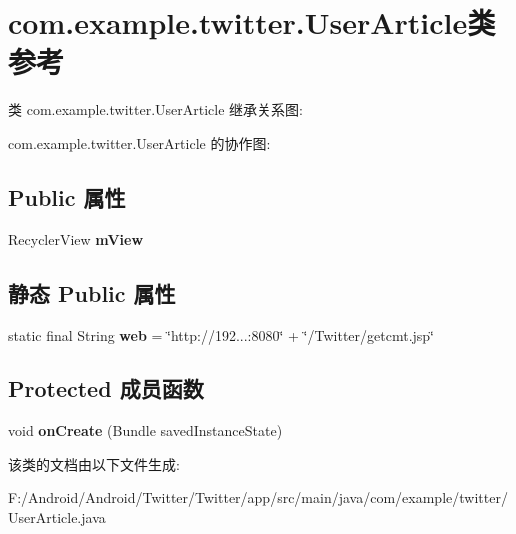\hypertarget{classcom_1_1example_1_1twitter_1_1_user_article}{}\section{com.\+example.\+twitter.\+User\+Article类 参考}
\label{classcom_1_1example_1_1twitter_1_1_user_article}


类 com.\+example.\+twitter.\+User\+Article 继承关系图\+:


com.\+example.\+twitter.\+User\+Article 的协作图\+:
\subsection*{Public 属性}
\begin{DoxyCompactItemize}
\item 
\mbox{\label{classcom_1_1example_1_1twitter_1_1_user_article_a8448f89d9d65561442160da7604212fc}} 
Recycler\+View {\bfseries m\+View}
\end{DoxyCompactItemize}
\subsection*{静态 Public 属性}
\begin{DoxyCompactItemize}
\item 
\mbox{\label{classcom_1_1example_1_1twitter_1_1_user_article_ade97a65866c24d3cffdfb94f341327d1}} 
static final String {\bfseries web} = \char`\"{}http\+://192...\+:8080\char`\"{} + \char`\"{}/Twitter/getcmt.\+jsp\char`\"{}
\end{DoxyCompactItemize}
\subsection*{Protected 成员函数}
\begin{DoxyCompactItemize}
\item 
\mbox{\label{classcom_1_1example_1_1twitter_1_1_user_article_a855d1cbf41f1594d53f3c90720045c23}} 
void {\bfseries on\+Create} (Bundle saved\+Instance\+State)
\end{DoxyCompactItemize}


该类的文档由以下文件生成\+:\begin{DoxyCompactItemize}
\item 
F\+:/\+Android/\+Android/\+Twitter/\+Twitter/app/src/main/java/com/example/twitter/User\+Article.\+java\end{DoxyCompactItemize}
